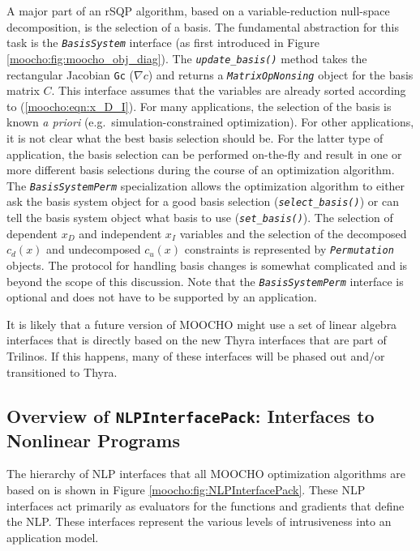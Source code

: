 \documentclass[pdf,12pt,report]{SANDreport}
\begin{document}
\label{moocho:page:BasisSystem}

A major part of an rSQP algorithm, based on a variable-reduction null-space
decomposition, is the selection of a basis.  The fundamental abstraction for
this task is the {}\texttt{\textit{Basis\-System}} interface (as first
introduced in Figure {}\ref{moocho:fig:moocho_obj_diag}).  The
{}\texttt{\textit{update\_basis()}} method takes the rectangular Jacobian
{}\texttt{Gc} ($\nabla c$) and returns a
{}\texttt{\textit{Matrix\-Op\-Nonsing}} object for the basis matrix $C$.  This
interface assumes that the variables are already sorted according to
(\ref{moocho:eqn:x_D_I}).  For many applications, the selection of the basis
is known {\em a priori} (e.g.\ simulation-constrained optimization).  For
other applications, it is not clear what the best basis selection should be.
For the latter type of application, the basis selection can be performed
on-the-fly and result in one or more different basis selections during the
course of an optimization algorithm.  The
{}\texttt{\textit{Basis\-System\-Perm}} specialization allows the optimization
algorithm to either ask the basis system object for a good basis selection
(\texttt{\textit{select\_basis()}}) or can tell the basis system object what
basis to use (\texttt{\textit{set\_basis()}}).  The selection of dependent
$x_D$ and independent $x_I$ variables and the selection of the decomposed
$c_d(x)$ and undecomposed $c_u(x)$ constraints is represented by
{}\texttt{\textit{Permutation}} objects.  The protocol for handling basis
changes is somewhat complicated and is beyond the scope of this discussion.
Note that the {}\texttt{\textit{Basis\-System\-Perm}} interface is optional
and does not have to be supported by an application.

It is likely that a future version of MOOCHO might use a set of linear algebra
interfaces that is directly based on the new Thyra interfaces that are part of
Trilinos.  If this happens, many of these interfaces will be phased out and/or
transitioned to Thyra.

%
\subsection{Overview of {}\texttt{NLPInterfacePack}: Interfaces to Nonlinear Programs}
\label{moocho:sec:nlpinterfacepack_overview}
%

The hierarchy of NLP interfaces that all MOOCHO optimization
algorithms are based on is shown in Figure
{}\ref{moocho:fig:NLPInterfacePack}.  These NLP interfaces act primarily
as evaluators for the functions and gradients that define the NLP.
These interfaces represent the various levels of intrusiveness into an
application model.
\end{document}
